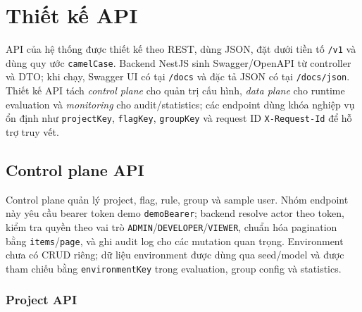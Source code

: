 \section{Thiết kế API}

API của hệ thống được thiết kế theo REST, dùng JSON, đặt dưới tiền tố \texttt{/v1} và dùng quy ước \texttt{camelCase}. Backend NestJS sinh Swagger/OpenAPI từ controller và DTO; khi chạy, Swagger UI có tại \texttt{/docs} và đặc tả JSON có tại \texttt{/docs/json}. Thiết kế API tách \textit{control plane} cho quản trị cấu hình, \textit{data plane} cho runtime evaluation và \textit{monitoring} cho audit/statistics; các endpoint dùng khóa nghiệp vụ ổn định như \texttt{projectKey}, \texttt{flagKey}, \texttt{groupKey} và request ID \texttt{X-Request-Id} để hỗ trợ truy vết.

\subsection{Control plane API}

Control plane quản lý project, flag, rule, group và sample user. Nhóm endpoint này yêu cầu bearer token demo \texttt{demoBearer}; backend resolve actor theo token, kiểm tra quyền theo vai trò \texttt{ADMIN}/\texttt{DEVELOPER}/\texttt{VIEWER}, chuẩn hóa pagination bằng \texttt{items}/\texttt{page}, và ghi audit log cho các mutation quan trọng. Environment chưa có CRUD riêng; dữ liệu environment được dùng qua seed/model và được tham chiếu bằng \texttt{environmentKey} trong evaluation, group config và statistics.

\subsubsection{Project API}

